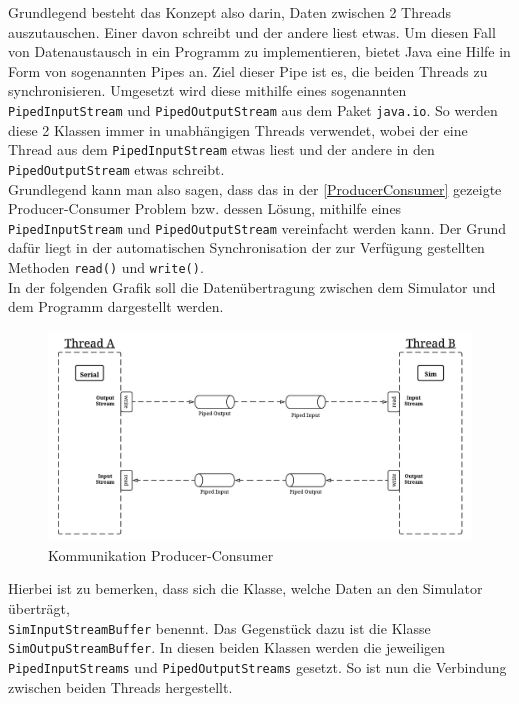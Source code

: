 Grundlegend besteht das Konzept also darin, Daten zwischen 2 Threads auszutauschen.
Einer davon schreibt und der andere liest etwas.
Um diesen Fall von Datenaustausch in ein Programm zu implementieren, bietet Java eine Hilfe in Form von sogenannten Pipes an.
Ziel dieser Pipe ist es, die beiden Threads zu synchronisieren.
Umgesetzt wird diese mithilfe eines sogenannten \lstinline[style=java]{PipedInputStream} und \lstinline[style=java]{PipedOutputStream} aus dem Paket \lstinline[style=java]{java.io}.
So werden diese 2 Klassen immer in unabhängigen Threads verwendet, wobei der eine Thread aus dem \lstinline[style=java]{PipedInputStream} etwas liest und der andere in den \lstinline[style=java]{PipedOutputStream} etwas schreibt.\\
Grundlegend kann man also sagen, dass das in der \autoref{ProducerConsumer} gezeigte Producer-Consumer Problem bzw. dessen Lösung, mithilfe eines \lstinline[style=java]{PipedInputStream} und \lstinline[style=java]{PipedOutputStream} vereinfacht werden kann.
Der Grund dafür liegt in der automatischen Synchronisation der zur Verfügung gestellten Methoden \lstinline[style=java]{read()} und \lstinline[style=java]{write()}.\\
In der folgenden Grafik soll die Datenübertragung zwischen dem Simulator und dem Programm dargestellt werden.
\begin{figure}[H]
\centering
\includegraphics[width=1\textwidth]{fig/ainf/Pipe.pdf}
\caption{Kommunikation Producer-Consumer}
\label{ProducerConsumer}
\end{figure}
Hierbei ist zu bemerken, dass sich die Klasse, welche Daten an den Simulator überträgt,\\\lstinline[style=java]{SimInputStreamBuffer} benennt.
Das Gegenstück dazu ist die Klasse \lstinline[style=java]{SimOutpuStreamBuffer}.
In diesen beiden Klassen werden die jeweiligen \lstinline[style=java]{PipedInputStreams} und \lstinline[style=java]{PipedOutputStreams} gesetzt.
So ist nun die Verbindung zwischen beiden Threads hergestellt.
